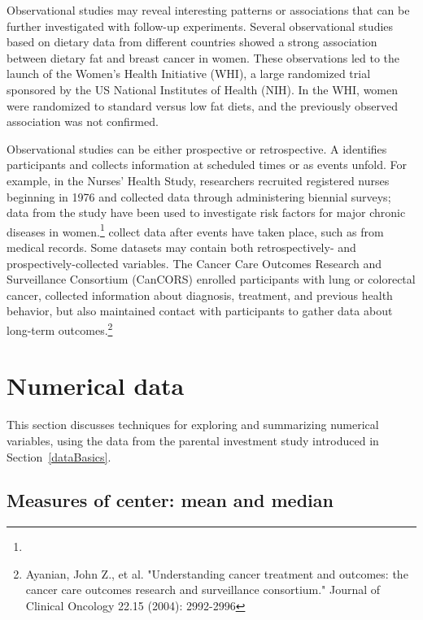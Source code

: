 Observational studies may reveal interesting patterns or associations that can be further investigated with follow-up experiments. Several observational studies based on dietary data from different countries showed a strong association between dietary fat and breast cancer in women. These observations led to the launch of the Women's Health Initiative (WHI), a large randomized trial sponsored by the US National Institutes of Health (NIH).  In the WHI, women were randomized to standard versus low fat diets, and the previously observed association was not confirmed.  

Observational studies can be either prospective or retrospective. A  identifies participants and collects information at scheduled times or as events unfold. For example, in the Nurses' Health Study, researchers recruited registered nurses beginning in 1976 and collected data through administering biennial surveys; data from the study have been used to investigate risk factors for major chronic diseases in women.\footnote{\texttt{}}  collect data after events have taken place, such as from medical records. Some datasets may contain both retrospectively- and prospectively-collected variables. The Cancer Care Outcomes Research and Surveillance Consortium (CanCORS) enrolled participants with lung or colorectal cancer, collected information about diagnosis, treatment, and previous health behavior, but also maintained contact with participants to gather data about long-term outcomes.\footnote{Ayanian, John Z., et al. "Understanding cancer treatment and outcomes: the cancer care outcomes research and surveillance consortium." Journal of Clinical Oncology 22.15 (2004): 2992-2996}  


\section[Numerical data]{Numerical data}
\label{numericalData}


This section discusses techniques for exploring and summarizing numerical variables, using the  data from the parental investment study introduced in Section~\ref{dataBasics}.

\subsection{Measures of center: mean and median}
\label{measuresOfCenter}

